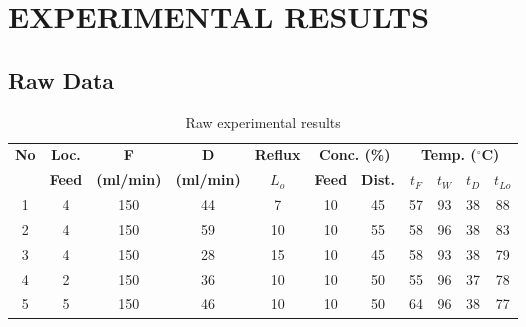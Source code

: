 \section{EXPERIMENTAL RESULTS}

\subsection{Raw Data}

\begin{table}[H]
    \centering
    \caption{Raw experimental results}
    \label{tab:raw_data}
    \small
    \begin{tabular}{ccccccccccc}
        \toprule
        \textbf{No} & \textbf{Loc.} & \textbf{F}       & \textbf{D}       & \textbf{Reflux} & \multicolumn{2}{c}{\textbf{Conc. (\%)}} & \multicolumn{4}{c}{\textbf{Temp. ($^\circ$C)}}                                                       \\
        \cmidrule(lr){6-7} \cmidrule(lr){8-11}
                    & \textbf{Feed} & \textbf{(ml/min)} & \textbf{(ml/min)} & \textbf{$L_o$}  & \textbf{Feed}                           & \textbf{Dist.}                                 & \textbf{$t_F$} & \textbf{$t_W$} & \textbf{$t_D$} & \textbf{$t_{Lo}$} \\
        \midrule
        1           & 4             & 150               & 44               & 7               & 10                                      & 45                                             & 57             & 93             & 38             & 88                \\
        2           & 4             & 150               & 59               & 10              & 10                                      & 55                                             & 58             & 96             & 38             & 83                \\
        3           & 4             & 150               & 28               & 15              & 10                                      & 45                                             & 58             & 93             & 38             & 79                \\
        4           & 2             & 150               & 36               & 10              & 10                                      & 50                                             & 55             & 96             & 37             & 78                \\
        5           & 5             & 150               & 46               & 10              & 10                                      & 50                                             & 64             & 96             & 38             & 77                \\
        \bottomrule
    \end{tabular}
\end{table}

